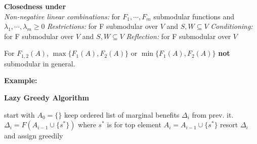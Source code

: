 \documentclass[10pt,parskip]{scrartcl}
\begin{document}
\begin{multicols*}{3}
\textbf{Closedness under}\\
\emph{Non-negative linear combinations: } for $F_1,\cdots,F_m$ submodular functions and $\lambda_1, \cdots, \lambda_m \geq 0$
\begingroup
    \fontsize{8pt}{8pt}\selectfont 
{}
\endgroup
\emph{Restrictions: } for F submodular over $V$ and $S,W \subseteq V$
\emph{Conditioning: } for F submodular over $V$ and $S,W \subseteq V$
\emph{Reflection: } for F submodular over $V$
\begin{mdframed}
	For $F_{1,2}(A)$, $\max \{F_1(A),F_2(A) \}$ or $\min \{F_1(A),F_2(A) \}$ \textbf{not} submodular in general.
\end{mdframed}

\textbf{Example: }
\begingroup
    \fontsize{8pt}{8pt}\selectfont 
{}
\endgroup

\textbf{Lazy Greedy Algorithm}
	\begin{algorithmic}
		\State start with $A_0=\{\}$
		\State keep ordered list of marginal benefits $\Delta_i$ from prev. it.
			\State $\Delta_i = F(A_{i-1} \cup \{s^\ast\})$ where $s^\ast$ is for top element
				\State $A_i = A_{i-1} \cup \{s^\ast\}$
			\Else
				\State resort $\Delta_i$ and assign greedily
			\EndIf
		\EndFor
	\end{algorithmic}




\end{multicols*}
\end{document}
